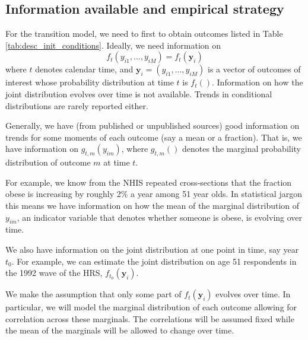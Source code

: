 \subsection{Information available and empirical strategy}
\label{sec:new_cohorts_model_empirical_strategy}
For the transition model, we need to first to obtain outcomes listed in Table \ref{tab:desc_init_conditions}. Ideally, we need 
information on 
\[
f_t(y_{i1},\ldots,y_{iM}) = f_t(\mathbf{y}_i)
\]
where $t$ denotes calendar time, and $\mathbf{y}_i = (y_{i1},\ldots,y_{iM})$ is a vector of outcomes 
of interest whose probability distribution at time $t$ is $f_t()$. Information on how the joint 
distribution evolves over time is not available. Trends in conditional distributions are rarely 
reported either.

Generally, we have (from published or unpublished sources) good information on trends for some moments 
of each outcome (say a mean or a fraction). That is, we have information on 
$g_{t,m}(y_{im})$,
where $g_{t,m}()$ denotes the marginal probability distribution of outcome $m$ at time $t$. 

For example, we know from the NHIS repeated cross-sections that the fraction obese is increasing by 
roughly 2\% a year among 51 year olds. In statistical jargon this means we have information on how the 
mean of the marginal distribution of $y_{im}$, an indicator variable that denotes whether someone is obese, 
is evolving over time. 

We also have information on the joint distribution at one point in time, say year $t_0$. For example,
 we can estimate the joint distribution on age 51 respondents in the 1992 wave of the HRS, $f_{t_0}(\mathbf{y}_i)$. 

We make the assumption that only some part of $f_t(\mathbf{y}_i)$ evolves over time. In particular, 
we will model the marginal distribution of each outcome allowing for correlation across these 
marginals. The correlations will be assumed fixed while the mean of the marginals will be allowed to 
change over time. 
